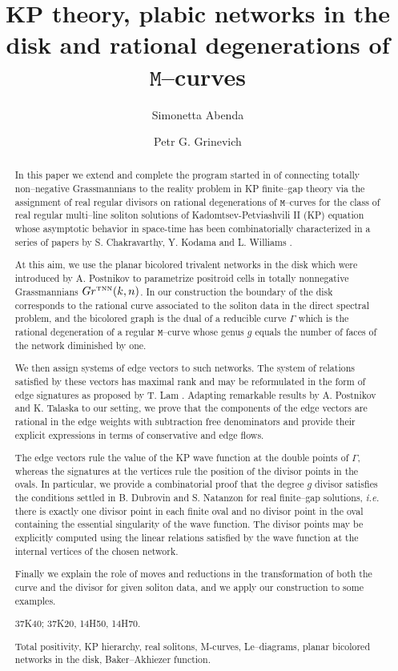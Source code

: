 \documentclass[11pt]{amsart}
\title{KP theory, plabic networks in the disk 
and rational degenerations of $\mathtt M$--curves}
\author{Simonetta Abenda}
\author{Petr G. Grinevich}
\theoremstyle{plain}
\numberwithin{equation}{section}
\def \GTNN {{Gr^{\mbox{\tiny TNN}} (k,n)}}
\begin{document}
\begin{abstract}
{In this paper we extend and complete the program started in \cite{AG1,AG3} of connecting totally non--negative Grassmannians to the reality problem in KP finite--gap theory via the assignment of real regular divisors on rational degenerations of $\mathtt M$--curves for the class of real regular multi--line soliton solutions of Kadomtsev-Petviashvili II (KP) equation whose asymptotic behavior in space-time has been combinatorially characterized in a series of papers by S. Chakravarthy, Y. Kodama and L. Williams \cite{CK, KW1,KW2}. 

At this aim, we use the planar bicolored trivalent networks in the disk which were introduced by A. Postnikov \cite{Pos} to parametrize positroid cells in totally nonnegative Grassmannians $\GTNN$. In our construction the boundary of the disk corresponds to the rational curve associated to the soliton data in the direct spectral problem, and the bicolored graph is the dual of a reducible curve $\Gamma$ which is the rational degeneration of a regular $\mathtt M$--curve whose genus $g$ equals the number of faces of the network diminished by one. 

We then assign systems of edge vectors to such networks. The system of relations satisfied by these vectors has maximal rank and may be reformulated in the form of edge signatures as proposed by T. Lam \cite{Lam2}. 
Adapting remarkable results by A. Postnikov \cite{Pos} and K. Talaska \cite{Tal2} to our setting, we prove that the components of the edge vectors are rational in the edge weights with subtraction free denominators and provide their explicit expressions in terms of conservative and edge flows. 

The edge vectors rule the value of the KP wave function at the double points of $\Gamma$, whereas the signatures at the vertices rule the position of the divisor points in the ovals. In particular,
we provide a combinatorial proof that the degree $g$ divisor satisfies the conditions settled in B. Dubrovin and S. Natanzon \cite{DN} for real finite--gap solutions, {\sl i.e.} there is exactly one divisor point in each finite oval and no divisor point in the oval containing the essential singularity of the wave function. The divisor points may be explicitly computed using the linear relations satisfied by the wave function at the internal vertices of the chosen network.

Finally we explain the role of moves and reductions in the transformation of both the curve and the divisor for given soliton data, and we apply our construction to some examples.} 

\medskip {} 37K40; 37K20, 14H50, 14H70.

  Total positivity, KP hierarchy, real solitons, M-curves, Le--diagrams, planar bicolored networks in the disk, Baker--Akhiezer function.
\end{abstract}
\maketitle
\end{document}

